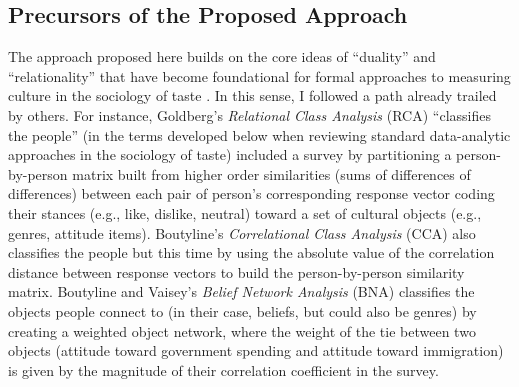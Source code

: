 \documentclass[a4paper,12pt]{extarticle}
\begin{document}
\subsection{Precursors of the Proposed Approach}
The approach proposed here builds on the core ideas of ``duality'' and ``relationality'' that have  become foundational for formal approaches to measuring culture in the sociology of taste \citep{mutzel2020duality, mohr2015formal}. In this sense, I followed a path already trailed by others. For instance, Goldberg's \citeyearpar{goldberg2011mapping} {\em Relational Class Analysis} (RCA) ``classifies the people'' (in the terms developed below when reviewing standard data-analytic approaches in the sociology of taste) included a survey by partitioning a person-by-person matrix built from higher order similarities (sums of differences of differences) between each pair of person's corresponding response vector coding their stances (e.g., like, dislike, neutral) toward a set of cultural objects (e.g., genres, attitude items). Boutyline's 
\citeyearpar{boutyline2017improving} {\em Correlational Class Analysis} (CCA) also classifies the people but this time by using the absolute value of the correlation distance between response vectors to build the person-by-person similarity matrix. Boutyline and Vaisey's {\em Belief Network Analysis} (BNA) classifies the objects people connect to (in their case, beliefs, but could also be genres) by creating a weighted object network, where the weight of the tie between two objects (attitude toward government spending and attitude toward immigration) is given by the magnitude of their correlation coefficient in the survey. 
\end{document}

